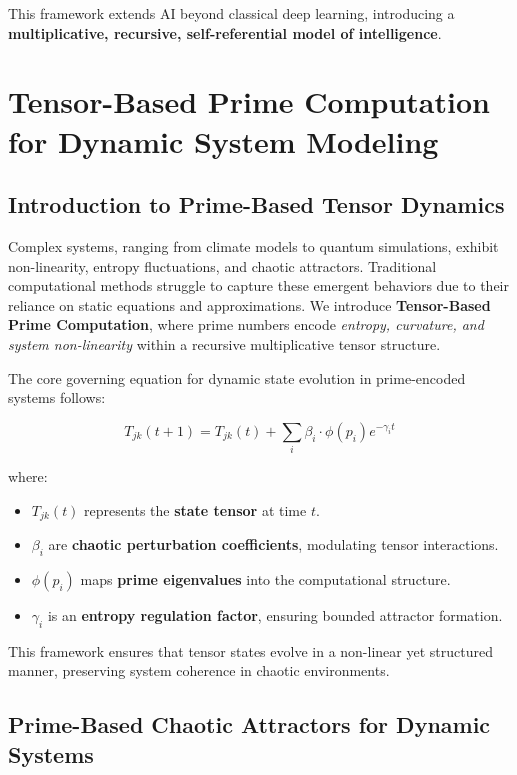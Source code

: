 \documentclass{article}
\theoremstyle{plain}
\theoremstyle{plain}
\theoremstyle{definition}
\theoremstyle{remark}
\begin{document}
This framework extends AI beyond classical deep learning, introducing a \textbf{multiplicative, recursive, self-referential model of intelligence}.
\section{Tensor-Based Prime Computation for Dynamic System Modeling}

\subsection{Introduction to Prime-Based Tensor Dynamics}

Complex systems, ranging from climate models to quantum simulations, exhibit non-linearity, entropy fluctuations, and chaotic attractors. Traditional computational methods struggle to capture these emergent behaviors due to their reliance on static equations and approximations. We introduce \textbf{Tensor-Based Prime Computation}, where prime numbers encode \textit{entropy, curvature, and system non-linearity} within a recursive multiplicative tensor structure.

The core governing equation for dynamic state evolution in prime-encoded systems follows:

\begin{equation}
T_{jk}(t+1) = T_{jk}(t) + \sum_{i} \beta_i \cdot \phi(p_i) e^{- \gamma_i t}
\end{equation}

where:
\begin{itemize}
    \item $T_{jk}(t)$ represents the \textbf{state tensor} at time $t$.
    \item $\beta_i$ are \textbf{chaotic perturbation coefficients}, modulating tensor interactions.
    \item $\phi(p_i)$ maps \textbf{prime eigenvalues} into the computational structure.
    \item $\gamma_i$ is an \textbf{entropy regulation factor}, ensuring bounded attractor formation.
\end{itemize}

This framework ensures that tensor states evolve in a non-linear yet structured manner, preserving system coherence in chaotic environments.

\subsection{Prime-Based Chaotic Attractors for Dynamic Systems}
\end{document}
